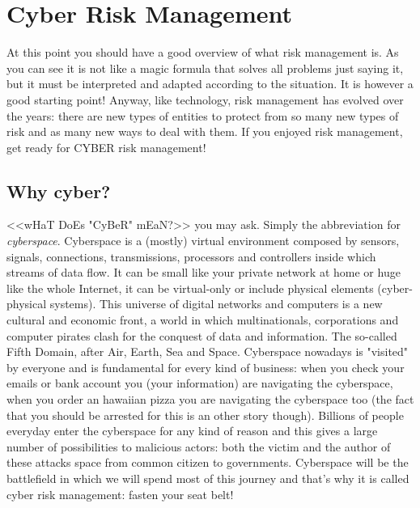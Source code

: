 \chapter{Cyber Risk Management}
At this point you should have a good overview of what risk management is. As you can see it is not like a magic formula that solves all problems just saying it, but it must be interpreted and adapted according to the situation. It is however a good starting point! 
Anyway, like technology, risk management has evolved over the years: there are new types of entities to protect from so many new types of risk and as many new ways to deal with them. If you enjoyed risk management, get ready for CYBER risk management!
\section{Why cyber?}
<<wHaT DoEs "CyBeR" mEaN?>> you may ask. Simply the abbreviation for \textit{cyberspace}.
Cyberspace is a (mostly) virtual environment composed by sensors, signals, connections, transmissions, processors and controllers inside which streams of data flow. It can be small like your private network at home or huge like the whole Internet, it can be virtual-only or include physical elements (cyber-physical systems). This universe of digital networks and computers is a new cultural and economic front, a world in which multinationals, corporations and computer pirates clash for the conquest of data and information. The so-called Fifth Domain, after Air, Earth, Sea and Space. Cyberspace nowadays is "visited" by everyone and is fundamental for every kind of business: when you check your emails or bank account you (your information) are navigating the cyberspace, when you order an hawaiian pizza you are navigating the cyberspace too (the fact that you should be arrested for this is an other story though). Billions of people everyday enter the cyberspace for any kind of reason and this gives a large number of possibilities to  malicious actors: both the victim and the author of these attacks space from common citizen to governments. Cyberspace will be the battlefield in which we will spend most of this journey and that's why it is called cyber risk management: fasten your seat belt!
